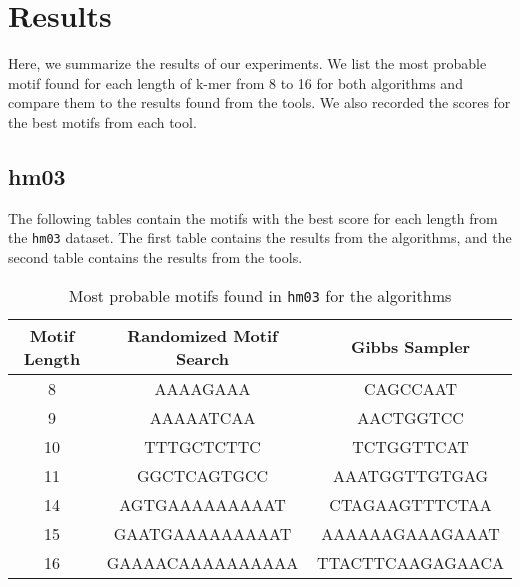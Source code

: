 \section{Results}

Here, we summarize the results of our experiments. We list the most probable motif found for each length of k-mer from 8 to 16 for both algorithms and compare them to the results found from the tools. We also recorded the scores for the best motifs from each tool.



\subsection{hm03}

The following tables contain the motifs with the best score for each length from the \texttt{hm03} dataset. The first table contains the results from the algorithms, and the second table contains the results from the tools.

\begin{table}[!h]
	\centering
	\begin{tabular}{|c|c|c|}
		\hline
		\textbf{Motif Length} & \textbf{Randomized Motif Search} & \textbf{Gibbs Sampler} \\
		\hline
		8                     & AAAAGAAA                         & CAGCCAAT               \\
		9                     & AAAAATCAA                        & AACTGGTCC              \\
		10                    & TTTGCTCTTC                       & TCTGGTTCAT             \\
		11                    & GGCTCAGTGCC                      & AAATGGTTGTGAG          \\
		14                    & AGTGAAAAAAAAAT                   & CTAGAAGTTTCTAA         \\
		15                    & GAATGAAAAAAAAAT                  & AAAAAAGAAAGAAAT        \\
		16                    & GAAAACAAAAAAAAAA                 & TTACTTCAAGAGAACA       \\
		\hline
	\end{tabular}
	\caption{Most probable motifs found in \texttt{hm03} for the algorithms}

\end{table}

